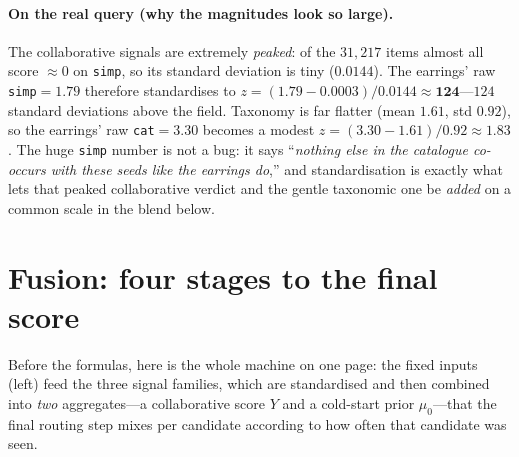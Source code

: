 \documentclass[11pt]{article}
\theoremstyle{remark}
\newcommand{\code}[1]{\texttt{\small #1}}
\begin{document}
\paragraph{On the real query (why the magnitudes look so large).} The collaborative signals are extremely
\emph{peaked}: of the $31{,}217$ items almost all score $\approx 0$ on \code{simp}, so its standard deviation is tiny
($0.0144$). The earrings' raw \code{simp}$=1.79$ therefore standardises to
$z=(1.79-0.0003)/0.0144\approx\mathbf{124}$---$124$ standard deviations above the field. Taxonomy is far flatter
(mean $1.61$, std $0.92$), so the earrings' raw \code{cat}$=3.30$ becomes a modest $z=(3.30-1.61)/0.92\approx 1.83$.
The huge \code{simp} number is not a bug: it says ``\emph{nothing else in the catalogue co-occurs with these seeds
like the earrings do},'' and standardisation is exactly what lets that peaked collaborative verdict and the gentle
taxonomic one be \emph{added} on a common scale in the blend below.

\section{Fusion: four stages to the final score}
\label{sec:fuse}

Before the formulas, here is the whole machine on one page: the fixed inputs (left) feed the three signal families,
which are standardised and then combined into \emph{two} aggregates---a collaborative score $Y$ and a cold-start
prior $\mu_0$---that the final routing step mixes per candidate according to how often that candidate was seen.
\end{document}

